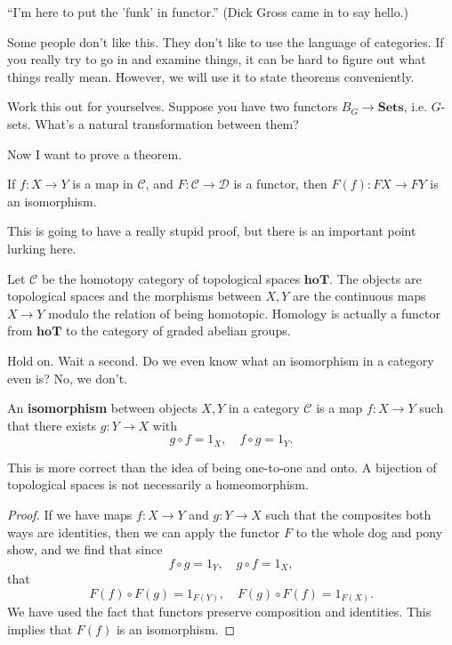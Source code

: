 \begin{remark} ``I'm here to put the 'funk' in functor.'' (Dick Gross came in
to say hello.) \end{remark}

Some people don't like this. They don't like to use the language of
categories. If you really try to go in and examine things, it can be hard to
figure out what things really mean. However, we will use it to state theorems
conveniently.

\begin{exercise} Work this out for yourselves. Suppose you have two functors
$B_G \to \mathbf{Sets}$, i.e. $G$-sets. What's a natural transformation
between them? \end{exercise}

Now I want to prove a theorem. \begin{theorem} If $f: X \to Y$ is a map in
$\mathcal{C}$, and $F: \mathcal{C} \to \mathcal{D}$ is a functor, then $F(f):
FX \to FY$ is an isomorphism. \end{theorem} This is going to have a really
stupid proof, but there is an important point lurking here. \begin{example}
Let $\mathcal{C}$ be the homotopy category of topological spaces
$\mathbf{hoT}$. The objects are topological spaces and the morphisms between
$X, Y$ are the continuous maps $X \to Y$ modulo the relation of being
homotopic. Homology is actually a functor from $\mathbf{hoT}$ to the category
of graded abelian groups. \end{example}

Hold on. Wait a second. Do we even know what an isomorphism in a category even
is? No, we don't.

\begin{definition} An \textbf{isomorphism} between objects $X, Y$ in a
category $\mathcal{C}$ is a map $f: X \to Y$ such that there exists $g: Y \to
X$ with \[ g \circ f = 1_X, \quad f \circ g = 1_Y. \] \end{definition}

This is more correct than the idea of being one-to-one and onto. A bijection
of topological spaces is not necessarily a homeomorphism.

\begin{proof} If we have maps $f: X \to Y$ and $g : Y \to X$ such that the
composites both ways are identities, then we can apply the functor $F$ to the
whole dog and pony show, and we find that since \[ f \circ g = 1_Y, \quad g
\circ f = 1_X, \] that \[ F(f) \circ F(g) = 1_{F(Y)}, \quad F(g) \circ F(f) =
1_{F(X)}. \] We have used the fact that functors preserve composition and
identities. This implies that $F(f)$ is an isomorphism. \end{proof}

